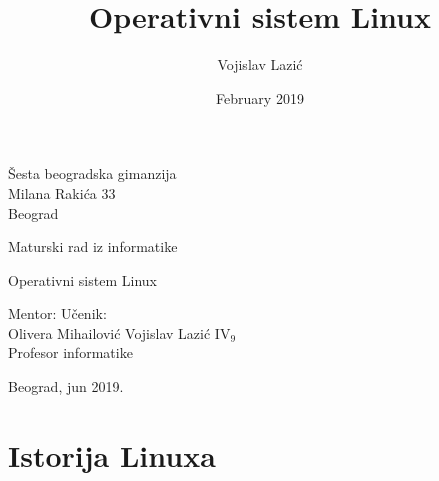\documentclass[12pt,twoside,a4paper]{article}
\title{Operativni sistem Linux}
\author{Vojislav Lazić}
\date{February 2019}
\begin{document}
    \thispagestyle{empty}
    \noindent
    Šesta beogradska gimanzija\\
    Milana Rakića 33\\
    Beograd
    \vfill
    \begin{center}
        \begin{Large}
        Maturski rad iz informatike\\
        \bigskip 
        \end{Large}
        {\Huge
        Operativni sistem Linux}
    \end{center}
    \vfill
    \noindent Mentor: \hfill Učenik:\\
    Olivera Mihailović \hfill Vojislav Lazić IV$_{9}$\\
    Profesor informatike
    \vfill
    \begin{center}
        Beograd, jun 2019.
    \end{center}
\thispagestyle{empty}


\newpage
\tableofcontents
\newpage
\section{Istorija Linuxa}


\renewcommand\refname{Literatura}


\end{document}
